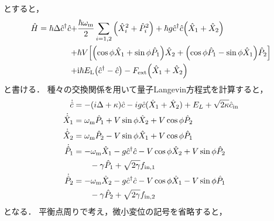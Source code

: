 \documentclass{report}
\begin{document}
      とすると，
      \begin{align}
        \hat{H} = \hbar\Delta\hat{c}^{\dag}\hat{c} +& \frac{\hbar\omega_{\mathrm{m}}}{2}\sum_{i = 1, 2}\qty(\hat{X}^2_i + \hat{P}^2_i) + \hbar g\hat{c}^{\dag}\hat{c}\qty(\hat{X}_1 + \hat{X}_2) \\ 
        +& \hbar V\qty[\qty(\cos\phi \hat{X}_1 + \sin\phi \hat{P}_1)\hat{X}_2 + \qty(\cos\phi\hat{P}_1 - \sin\phi\hat{X}_1)\hat{P}_2] \\ 
        +& \mathrm{i}\hbar E_{\mathrm{L}}\qty(\hat{c}^{\dag} - \hat{c}) - F_{\mathrm{ext}}\qty(\hat{X}_1 + \hat{X}_2)
      \end{align}
      と書ける．
      種々の交換関係を用いて量子Langevin方程式を計算すると，
      \begin{align}
        \dot{\hat{c}} &= -(i\Delta + \kappa)\hat{c} - ig\hat{c}(\hat{X}_1 + \hat{X}_2) + E_L + \sqrt{2\kappa}\hat{c}_{\mathrm{in}}\\
        \dot{\hat{X}}_1 &= \omega_{\mathrm{m}}\hat{P}_1 + V \sin\phi\hat{X}_2 + V \cos\phi\hat{P}_2 \\
        \dot{\hat{X}}_2 &= \omega_{\mathrm{m}}\hat{P}_2 - V \sin\phi\hat{X}_1 + V \cos\phi\hat{P}_1 \\
        \dot{\hat{P}}_1 &= -\omega_{\mathrm{m}}\hat{X}_1 - g\hat{c}^{\dagger}\hat{c} - V \cos\phi\hat{X}_2 + V \sin\phi\hat{P}_2 \\
        &\qquad -\gamma\hat{P}_1 + \sqrt{2\gamma}f_{\mathrm{in, 1}} \\
        \dot{\hat{P}}_2 &= -\omega_{\mathrm{m}}\hat{X}_2 - g\hat{c}^{\dagger}\hat{c} - V \cos\phi\hat{X}_1 - V \sin\phi\hat{P}_1 \\
        &\qquad -\gamma\hat{P}_2 + \sqrt{2\gamma}f_{\mathrm{in, 2}}
    \end{align}
    となる．
    平衡点周りで考え，微小変位の記号を省略すると，
\end{document}
